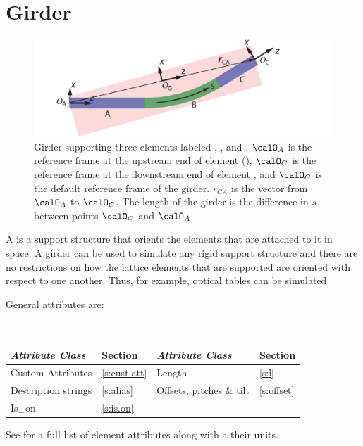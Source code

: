 \section{Girder}
\label{s:girder}

\begin{figure}[t]
  \centering
  \includegraphics{girder.pdf}
  \caption[Girder example.] {
Girder supporting three elements labeled , , and .
$\calO_A$ is the reference frame at the upstream end of element 
(), $\calO_C$ is the reference frame at the
downstream end of element , and $\calO_G$ is the default
 reference frame of the girder. $r_{CA}$ is the vector from
$\calO_A$ to $\calO_C$. The length  of the girder is the
difference in $s$ between points $\calO_C$ and $\calO_A$.
  }
  \label{f:girder}
\end{figure}

A  is a support structure that orients the elements that
are attached to it in space. A girder can be used to simulate any
rigid support structure and there are no restrictions on how the lattice
elements that are supported are oriented with respect to one another.
Thus, for example, optical tables can be simulated.

General  attributes are:
\begin{center}
\tt
\begin{tabular}{llll} \toprule
  {\sl Attribute Class}      & Section           & {\sl Attribute Class}      & Section         \\ \midrule
  Custom Attributes          & \ref{s:cust.att}  & Length                     & \ref{s:l}       \\
  Description strings        & \ref{s:alias}     & Offsets, pitches \& tilt   & \ref{s:offset}  \\ 
  Is_on                      & \ref{s:is.on}     &                            &                 \\
  \bottomrule
\end{tabular}
\end{center}
\toffset
See  for a full list of element attributes along with a their units.

